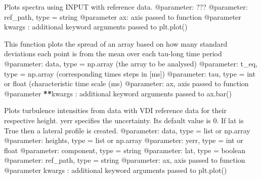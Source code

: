 \documentclass[letterpaper,10pt,english]{sphinxmanual}
\begin{document}

\begin{fulllineitems}
\label{\detokenize{index:windtunnel.plot_spectra}}
Plots spectra using INPUT with reference data.
@parameter: ???
@parameter: ref\_path, type = string
@parameter ax: axis passed to function
@parameter kwargs : additional keyword arguments passed to plt.plot()

\end{fulllineitems}


\begin{fulllineitems}
\label{\detokenize{index:windtunnel.plot_stdevs}}
This function plots the spread of an array based on how many standard 
deviations each point is from the mean over each tau-long time period
@parameter: data, type = np.array (the array to be analysed)
@parameter: t\_eq, type = np.array (corresponding times steps in {[}ms{]})
@parameter: tau, type = int or float (characteristic time scale (ms)
@parameter: ax, axis passed to function
@parameter {\color{red}\bfseries{}**}kwargs : additional keyword arguments passed to ax.bar()

\end{fulllineitems}


\begin{fulllineitems}
\label{\detokenize{index:windtunnel.plot_turb_int}}
Plots turbulence intensities from data with VDI reference data for 
their respective height. yerr specifies the uncertainty. Its default value
is 0. If lat is True then a lateral profile is created.
@parameter: data, type = list or np.array
@parameter: heights, type = list or np.array
@parameter: yerr, type = int or float
@parameter: component, type = string
@parameter: lat, type = boolean
@parameter: ref\_path, type = string
@parameter: ax, axis passed to function    
@parameter kwargs : additional keyword arguments passed to plt.plot()

\end{fulllineitems}
\end{document}
